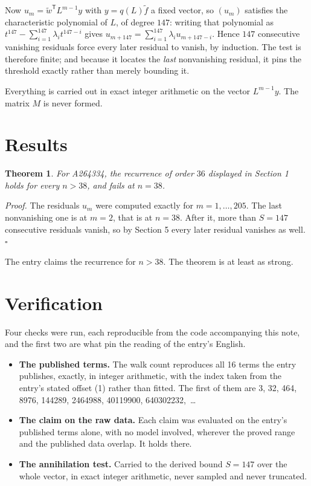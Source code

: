 \documentclass[11pt]{article}
\newtheorem{theorem}{Theorem}
\theoremstyle{definition}
\begin{document}
Now $u_m = \tilde w^{\mathsf T} L^{m-1} y$ with $y = q(L)\tilde f$ a fixed vector, so $(u_m)$ satisfies the characteristic polynomial of $L$, of degree $147$: writing that polynomial as $t^{147} - \sum_{i=1}^{147} \lambda_i t^{147-i}$ gives $u_{m+147} = \sum_{i=1}^{147} \lambda_i u_{m+147-i}$. Hence $147$ consecutive vanishing residuals force every later residual to vanish, by induction. The test is therefore finite; and because it locates the {\itshape last} nonvanishing residual, it pins the threshold exactly rather than merely bounding it.

Everything is carried out in exact integer arithmetic on the vector $L^{m-1}y$. The matrix $M$ is never formed.

\section{Results}

\begin{theorem} For A264334, the recurrence of order $36$ displayed in Section 1 holds for every $n > 38$, and fails at $n = 38$.\end{theorem}

{\itshape Proof.} The residuals $u_m$ were computed exactly for $m = 1,\dots,205$. The last nonvanishing one is at $m = 2$, that is at $n = 38$. After it, more than $S = 147$ consecutive residuals vanish, so by Section 5 every later residual vanishes as well. $\square$

The entry claims the recurrence for $n > 38$. The theorem is at least as strong.

\section{Verification}

Four checks were run, each reproducible from the code accompanying this note, and the first two are what pin the reading of the entry's English.

\begin{itemize}

\item {\bfseries The published terms.} The walk count reproduces all 16 terms the entry publishes, exactly, in integer arithmetic, with the index taken from the entry's stated offset (1) rather than fitted. The first of them are 3, 32, 464, 8976, 144289, 2464988, 40119900, 640302232,~\dots

\item {\bfseries The claim on the raw data.} Each claim was evaluated on the entry's published terms alone, with no model involved, wherever the proved range and the published data overlap. It holds there.

\item {\bfseries The annihilation test.} Carried to the derived bound $S = 147$ over the whole vector, in exact integer arithmetic, never sampled and never truncated.

\end{itemize}
\end{document}
